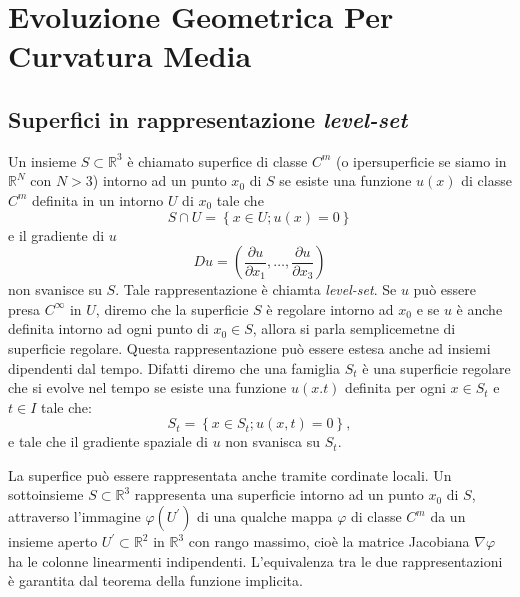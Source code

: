 \chapter{Evoluzione Geometrica Per Curvatura Media}
%
%
\section{Superfici in rappresentazione \emph{level-set}}
\label{sec:cp1-00}
Un insieme $S\subset\mathbb{R}^3$ è chiamato superfice di classe $C^m$ (o ipersuperficie se siamo in $\mathbb{R}^N$ con $N>3$) intorno ad un punto $x_0$ di $S$ se esiste una funzione $u(x)$ di classe $C^m$ definita in un intorno $U$ di $x_0$ tale che
\[
S\cap U=\left\{x\in U; u(x)=0\right\}
\]
e il gradiente di $u$
\[
 Du=\left(\frac{\partial u}{\partial x_1},\dots,\frac{\partial u}{\partial x_3}\right)
\]
non svanisce su $S$. Tale rappresentazione è chiamta \emph{level-set}. Se $u$ può essere presa $C^{\infty}$ in $U$, diremo che la superficie $S$ è regolare intorno ad $x_0$ e se $u$ è anche definita intorno ad ogni punto di $x_0\in S$, allora si parla semplicemetne di superficie regolare. Questa rappresentazione può essere estesa anche ad insiemi dipendenti dal tempo. Difatti diremo che una famiglia $S_t$ è una superficie regolare che si evolve nel tempo se esiste una funzione $u(x.t)$ definita per ogni $x\in S_t$ e $t\in I$ tale che:
\[
S_t=\left\{x\in S_t; u(x,t)=0\right\},
\]
e tale che il gradiente spaziale di $u$ non svanisca su $S_t$.
\begin{osservazione}
 La superfice può essere rappresentata anche tramite cordinate locali. Un sottoinsieme $S\subset\mathbb{R}^3$ rappresenta una superficie intorno ad un punto $x_0$ di $S$, attraverso l'immagine $\varphi(U^{'})$ di una qualche mappa $\varphi$ di classe $C^m$ da un insieme aperto $U^{'}\subset\mathbb{R}^2$ in $\mathbb{R}^3$ con rango massimo, cioè la matrice Jacobiana $\nabla\varphi$ ha le colonne linearmenti indipendenti.
L'equivalenza tra le due rappresentazioni è garantita dal teorema della funzione implicita.
\end{osservazione} 

